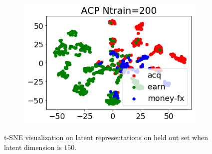 \documentclass[twoside]{article}
\newcommand{\todo}[1]{{\color{red}#1}}
\newcommand{\bX}{\mathbf{X}}
\newcommand{\bx}{\mathbf{x}}
\begin{document}
\begin{figure}
\begin{subfigure}[t]{0.33\textwidth}
        \label{fig: reuters_h150_acp_500}
    \end{subfigure}%
    ~
    \begin{subfigure}[t]{0.33\textwidth}
        \centering
        \includegraphics[width=1.0\linewidth]{reuters_acp200_h150.png}
        \label{fig: reuters_h150_acp_200}
    \end{subfigure}
\caption{\small t-SNE visualization on latent representations on held out set when latent dimension is $150$.}
\label{fig: reuters_hvis_150}
\end{figure}

\end{document}

